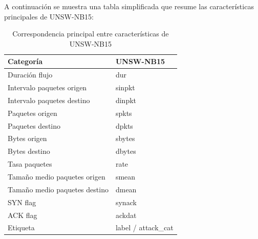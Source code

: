 A continuación se muestra una tabla simplificada que resume las características principales de UNSW-NB15:

\begin{table}[H]
\centering
\caption{Correspondencia principal entre características de UNSW-NB15}
\label{tab:relacion-cic-unsw}
\begin{tabular}{|l|l|}
\hline
\textbf{Categoría} & \textbf{UNSW-NB15} \\
\hline
Duración flujo & dur \\
Intervalo paquetes origen & sinpkt \\
Intervalo paquetes destino & dinpkt \\
Paquetes origen & spkts \\
Paquetes destino & dpkts \\
Bytes origen & sbytes \\
Bytes destino & dbytes \\
Tasa paquetes & rate \\
Tamaño medio paquetes origen & smean \\
Tamaño medio paquetes destino & dmean \\
SYN flag & synack \\
ACK flag & ackdat \\
Etiqueta & label / attack\_cat \\ 
\hline
\end{tabular}
\end{table}


